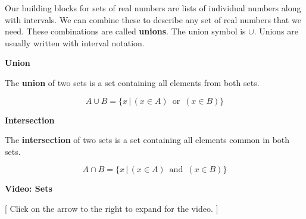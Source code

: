 \documentclass{ximera}
\begin{document}
\hfill\break

Our building blocks for sets of real numbers are lists of individual numbers along with intervals.  We can combine these to describe any set of real numbers that we need.  These combinations are called \textbf{unions}.  The union symbol is $\cup$. Unions are usually written with interval notation.



\begin{definition} \textbf{\textcolor{green!50!black}{Union}}

The \textbf{union} of two sets is a set containing all elements from both sets.


\[
A \cup B = \{  x \, | \, (x \in A) \, \text{ or } \, (x \in B)  \}
\]


\end{definition}





\begin{definition} \textbf{\textcolor{green!50!black}{Intersection}}

The \textbf{intersection} of two sets is a set containing all elements common in both sets.


\[
A \cap B = \{  x \, | \, (x \in A) \, \text{ and } \, (x \in B)  \}
\]


\end{definition}









\begin{onlineOnly}
\begin{explanation} \textbf{\textcolor{red!75!green}{Video: Sets}}

[ Click on the arrow to the right to expand for the video. ]
\begin{expandable} 

\begin{center}
\end{center}

\end{expandable}

\end{explanation}
\end{onlineOnly}
\end{document}
